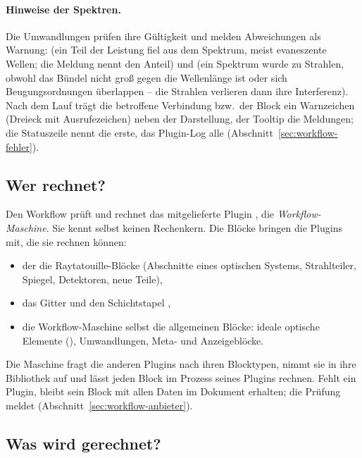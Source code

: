 \paragraph{Hinweise der Spektren.} Die Umwandlungen prüfen ihre Gültigkeit und melden
Abweichungen als Warnung:  (ein Teil der Leistung fiel aus dem Spektrum,
meist evaneszente Wellen; die Meldung nennt den Anteil) und  (ein
Spektrum wurde zu Strahlen, obwohl das Bündel nicht groß gegen die Wellenlänge ist oder sich
Beugungsordnungen überlappen -- die Strahlen verlieren dann ihre Interferenz). Nach dem Lauf trägt
die betroffene Verbindung bzw.\ der Block ein Warnzeichen (Dreieck mit Ausrufezeichen) neben der
Darstellung, der Tooltip die Meldungen; die Statuszeile nennt die erste, das Plugin-Log alle
(Abschnitt~\ref{sec:workflow-fehler}).

\subsection{Wer rechnet?}

Den Workflow prüft und rechnet das mitgelieferte Plugin , die
\emph{Workflow-Maschine}. Sie kennt selbst keinen Rechenkern. Die
Blöcke bringen die Plugins mit, die sie rechnen können:

\begin{itemize}
  \item der  die Raytatouille-Blöcke  (Abschnitte eines
        optischen Systems, Strahlteiler, Spiegel, Detektoren, neue Teile),
  \item {} das Gitter  und den Schichtstapel
        ,
  \item die Workflow-Maschine selbst die allgemeinen Blöcke: ideale optische Elemente
        (), Umwandlungen, Meta- und Anzeigeblöcke.
\end{itemize}

Die Maschine fragt die anderen Plugins nach ihren Blocktypen, nimmt sie in ihre Bibliothek auf
und lässt jeden Block im Prozess seines Plugins rechnen. Fehlt ein Plugin, bleibt sein Block mit
allen Daten im Dokument erhalten; die Prüfung meldet 
(Abschnitt~\ref{sec:workflow-anbieter}).

\subsection{Was wird gerechnet?}\label{sec:workflow-was}

